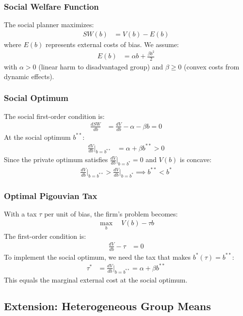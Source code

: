 \subsubsection{Social Welfare Function}
The social planner maximizes:
\begin{align}
SW(b) &= V(b) - E(b)
\end{align}
where $E(b)$ represents external costs of bias. We assume:
\begin{align}
E(b) &= \alpha b + \frac{\beta b^2}{2}
\end{align}
with $\alpha > 0$ (linear harm to disadvantaged group) and $\beta \geq 0$ (convex costs from dynamic effects).

\subsubsection{Social Optimum}
The social first-order condition is:
\begin{align}
\frac{dSW}{db} &= \frac{dV}{db} - \alpha - \beta b = 0 \label{eq:social_foc}
\end{align}
At the social optimum $b^{**}$:
\begin{align}
\frac{dV}{db}\bigg|_{b=b^{**}} &= \alpha + \beta b^{**} > 0
\end{align}
Since the private optimum satisfies $\frac{dV}{db}\big|_{b=b^*} = 0$ and $V(b)$ is concave:
\begin{align}
\frac{dV}{db}\bigg|_{b=b^{**}} > \frac{dV}{db}\bigg|_{b=b^*} \implies b^{**} < b^*
\end{align}

\subsubsection{Optimal Pigouvian Tax}
With a tax $\tau$ per unit of bias, the firm's problem becomes:
\begin{align}
\max_b \quad V(b) - \tau b
\end{align}
The first-order condition is:
\begin{align}
\frac{dV}{db} - \tau &= 0
\end{align}
To implement the social optimum, we need the tax that makes $b^*(\tau) = b^{**}$:
\begin{align}
\tau^* &= \frac{dV}{db}\bigg|_{b=b^{**}} = \alpha + \beta b^{**}
\end{align}
This equals the marginal external cost at the social optimum.

\subsection{Extension: Heterogeneous Group Means}

